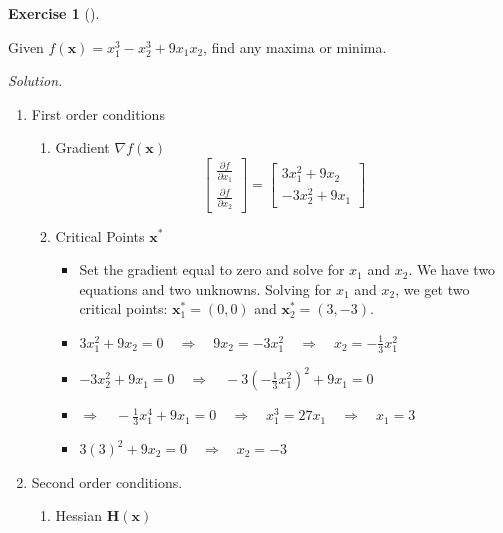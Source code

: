 \documentclass[
  letterpaper,
]{book}
\providecommand{\tightlist}{%
  \setlength{\itemsep}{0pt}\setlength{\parskip}{0pt}}\usepackage{longtable,booktabs,array}
\theoremstyle{definition}
\theoremstyle{definition}
\theoremstyle{plain}
\theoremstyle{definition}
\newtheorem{exercise}{Exercise}[chapter]
\theoremstyle{plain}
\theoremstyle{plain}
\theoremstyle{remark}
\begin{document}
\leavevmode{}%
\begin{exercise}[]\label{exr-}

Given \(f(\mathbf{x})=x_1^3-x_2^3+9x_1x_2\), find any maxima or minima.

\end{exercise}

\emph{Solution.}

\begin{enumerate}
\def\labelenumi{\arabic{enumi}.}
\tightlist
\item
  First order conditions

  \begin{enumerate}
  \def\labelenumii{(\arabic{enumii})}
  \tightlist
  \item
    Gradient \(\nabla f(\mathbf{x})\)
    \[\begin{bmatrix} \frac{\partial f}{\partial x_1} \\ 
    \frac{\partial f}{\partial x_2}\end{bmatrix} =
    \begin{bmatrix} 3x_1^2+9x_2 \\ -3x_2^2+9x_1 \end{bmatrix}\]
  \item
    Critical Points \(\mathbf{x^*}\)

    \begin{itemize}
    \tightlist
    \item
      Set the gradient equal to zero and solve for \(x_1\) and \(x_2\).
      We have two equations and two unknowns. Solving for \(x_1\) and
      \(x_2\), we get two critical points: \(\mathbf{x}_1^*=(0,0)\) and
      \(\mathbf{x}_2^*=(3,-3)\).
    \item
      \(3x_1^2 + 9x_2 = 0 \quad \Rightarrow \quad 9x_2 = -3x_1^2 \quad \Rightarrow \quad x_2 = -\frac{1}{3}x_1^2\)
    \item
      \(-3x_2^2 + 9x_1 = 0 \quad \Rightarrow \quad -3(-\frac{1} {3}x_1^2)^2 + 9x_1 = 0\)
    \item
      \(\Rightarrow \quad -\frac{1}{3}x_1^4 + 9x_1 = 0 \quad \Rightarrow \quad x_1^3 = 27x_1 \quad \Rightarrow \quad x_1 = 3\)
    \item
      \(3(3)^2 + 9x_2 = 0 \quad \Rightarrow \quad x_2 = -3\)
    \end{itemize}
  \end{enumerate}
\item
  Second order conditions.

  \begin{enumerate}
  \def\labelenumii{(\arabic{enumii})}
  \item
    Hessian \(\mathbf{H(x)}\)


\end{enumerate}
\end{enumerate}
\end{document}
